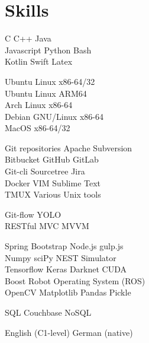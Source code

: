 \documentclass[]{resume}
\begin{document}
\vfill
\begin{minipage}[t]{0.33\textwidth}
\section{Skills}
C \textbullet{} C++ \textbullet{} Java \\
Javascript \textbullet{} Python \textbullet{} Bash \\
Kotlin \textbullet{} Swift \textbullet{} Latex \\ \sectionsep

Ubuntu Linux x86-64/32 \\
Ubuntu Linux ARM64 \\
Arch Linux x86-64 \\
Debian GNU/Linux x86-64 \\
MacOS x86-64/32 \\ \sectionsep

Git repositories \textbullet{} Apache Subversion \\
Bitbucket \textbullet{} GitHub \textbullet{} GitLab \\
Git-cli \textbullet{} Sourcetree \textbullet{} Jira \\
Docker \textbullet{} VIM \textbullet{} Sublime Text \\
TMUX \textbullet{} Various Unix tools \\ \sectionsep

Git-flow \textbullet{} YOLO \\
RESTful \textbullet{} MVC \textbullet{} MVVM \\ \sectionsep

Spring \textbullet{} Bootstrap \textbullet{} Node.js \textbullet{} gulp.js \\
Numpy \textbullet{} sciPy \textbullet{} NEST Simulator \\
Tensorflow  \textbullet{} Keras \textbullet{} Darknet \textbullet{} CUDA \\
Boost \textbullet{} Robot Operating System (ROS) \\
OpenCV \textbullet{} Matplotlib \textbullet{} Pandas \textbullet{} Pickle \\ \sectionsep

SQL \textbullet{} Couchbase NoSQL\\ \sectionsep

English (C1-level) \textbullet{} German (native)

\end{minipage}\quad %
\end{document}
